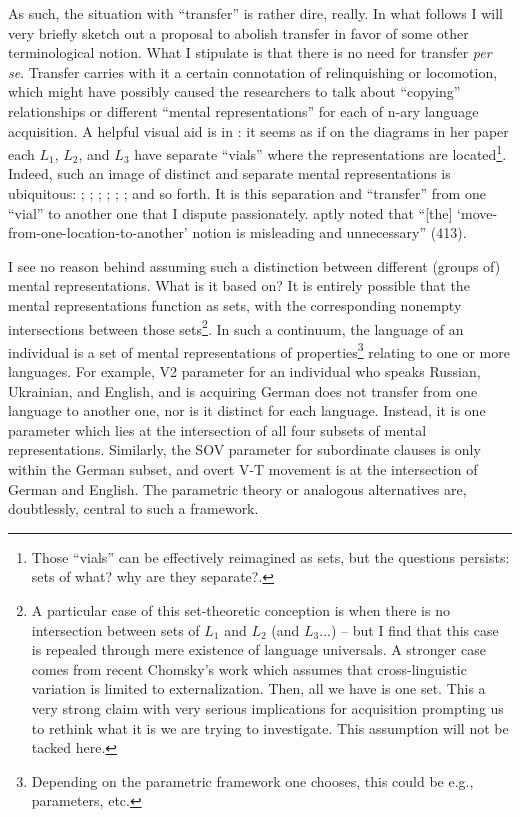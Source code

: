 \documentclass{article}
\begin{document}
As such, the situation with ``transfer'' is rather dire, really. In what follows I will very briefly sketch out a proposal to abolish transfer in favor of some other terminological notion. What I stipulate is that there is no need for transfer \textit{per se}. Transfer carries with it a certain connotation of relinquishing or locomotion, which might have possibly caused the researchers to talk about ``copying'' relationships or different ``mental representations'' for each of n-ary language acquisition. A helpful visual aid is in \cite{westergaard_microvariation_2021}: it seems as if on the diagrams in her paper each $L_1$, $L_2$, and $L_3$ have separate ``vials'' where the representations are located\footnote{Those ``vials'' can be effectively reimagined as sets, but the questions persists: sets of what? why are they separate?.}. Indeed, such an image of distinct and separate mental representations is ubiquitous: \citet[pp. 150, 158]{kroll_category_1994}; \citet{grosjean_bilinguals_2001}; \citet[pp. 106ff and adapted visuals references therein]{kroll_cognitive_2003}; \citet[pp. 146f]{pavlenko_conceptual_2009}; \citet[p. 752]{riehl_mental_2010}; \citet[p. 268]{benati_input_2017}; and so forth. It is this separation and ``transfer'' from one ``vial'' to another one that I dispute passionately. \cite{sharwood_smith_language_2021} aptly noted that ``[the] ‘move-from-one-location-to-another’ notion is misleading and unnecessary'' (413). 

I see no reason behind assuming such a distinction between different (groups of) mental representations. What is it based on? It is entirely possible that the mental representations function as sets, with the corresponding nonempty intersections between those sets\footnote{A particular case of this set-theoretic conception is when there is no intersection between sets of $L_1$ and $L_2$ (and $L_3...$) -- but I find that this case is repealed through mere existence of language universals. A stronger case comes from recent Chomsky's work which assumes that cross-linguistic variation is limited to externalization. Then, all we have is one set. This a very strong claim with very serious implications for acquisition prompting us to rethink what it is we are trying to investigate. This assumption will not be tacked here.}. In such a continuum, the language of an individual is a set of mental representations of properties\footnote{Depending on the parametric framework one chooses, this could be e.g., parameters, etc.} relating to one or more languages. For example, V2 parameter for an individual who speaks Russian, Ukrainian, and English, and is acquiring German does not transfer from one language to another one, nor is it distinct for each language. Instead, it is one parameter which lies at the intersection of all four subsets of mental representations. Similarly, the SOV parameter for subordinate clauses is only within the German subset, and overt V-T movement is at the intersection of German and English. The parametric theory or analogous alternatives are, doubtlessly, central to such a framework.
\end{document}
